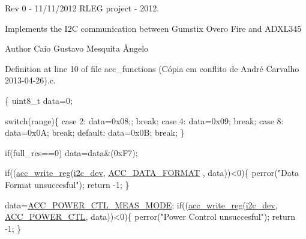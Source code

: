 Rev 0 -\/ 11/11/2012 R\-L\-E\-G project -\/ 2012. 

Implements the I2\-C communication between Gumstix Overo Fire and A\-D\-X\-L345 \begin{DoxyAuthor}{Author}
Caio Gustavo Mesquita Ângelo 
\end{DoxyAuthor}


Definition at line 10 of file acc\-\_\-functions (\-Cópia em conflito de André Carvalho 2013-\/04-\/26).\-c.


\begin{DoxyCode}
\{ 
  uint8\_t data=0;

  \textcolor{keywordflow}{switch}(range)\{
    \textcolor{keywordflow}{case} 2:
      data=0x08;;
      \textcolor{keywordflow}{break};
    \textcolor{keywordflow}{case} 4:
      data=0x09;
      \textcolor{keywordflow}{break};
    \textcolor{keywordflow}{case} 8:
      data=0x0A;
      \textcolor{keywordflow}{break};
    \textcolor{keywordflow}{default}:
      data=0x0B;
      \textcolor{keywordflow}{break};
  \}
  
  \textcolor{keywordflow}{if}(full\_res==0)
    data=data&(0xF7);
  
  \textcolor{keywordflow}{if}((\hyperlink{group__acc_ga534116416343122de29a5b6ade6876bd}{acc\_write\_reg}(\hyperlink{CommunicationV0_2communication_8c_a7751bd45ac1064efb35adf1f19c25db8}{i2c\_dev}, \hyperlink{communication_2imu__regs_8h_ab4eb7fc69b2a37ee750d3400fc2c53a1}{ACC\_DATA\_FORMAT}
      , data))<0)\{
    perror(\textcolor{stringliteral}{"Data Format unsuccesful"});
    \textcolor{keywordflow}{return} -1;
  \}
  
  data=\hyperlink{communication_2imu__regs_8h_a9a841ba3e094b01ea439584e12b25894}{ACC\_POWER\_CTL\_MEAS\_MODE};
  \textcolor{keywordflow}{if}((\hyperlink{group__acc_ga534116416343122de29a5b6ade6876bd}{acc\_write\_reg}(\hyperlink{CommunicationV0_2communication_8c_a7751bd45ac1064efb35adf1f19c25db8}{i2c\_dev}, \hyperlink{communication_2imu__regs_8h_ad857d62b61f349216faeda06eff5f9c6}{ACC\_POWER\_CTL}, 
      data))<0)\{
    perror(\textcolor{stringliteral}{"Power Control unsuccesful"});
    \textcolor{keywordflow}{return} -1;
  \}
  

\end{DoxyCode}
